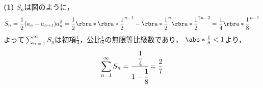\documentclass[uplatex,dvipdfmx,a4paper]{jsarticle}
\begin{document}
\textbf{(1)}
\(S_n\)は図のように，
\begin{align}
  S_n = \frac{1}{2} (a_n-a_{n+1})a_n^2
  =\frac{1}{2}\rbra*{\rbra*{\frac{1}{2}}^{n-1}-\rbra*{\frac{1}{2}}^{n}}\rbra*{\frac{1}{2}}^{2n-2}
  =\frac{1}{4}\rbra*{\frac{1}{8}}^{n-1}
\end{align}
よって\(\sum_{n=1}^\infty S_n\)は初項\(\frac{1}{4}\)，公比\(\frac{1}{8}\)の無限等比級数であり，
\(\abs*{\frac{1}{8}}<1\)より，
\begin{align}
  \sum_{n=1}^\infty S_n=\cfrac{\cfrac{1}{4}}{1-\cfrac{1}{8}}=\frac{2}{7}
\end{align}
\end{document}
